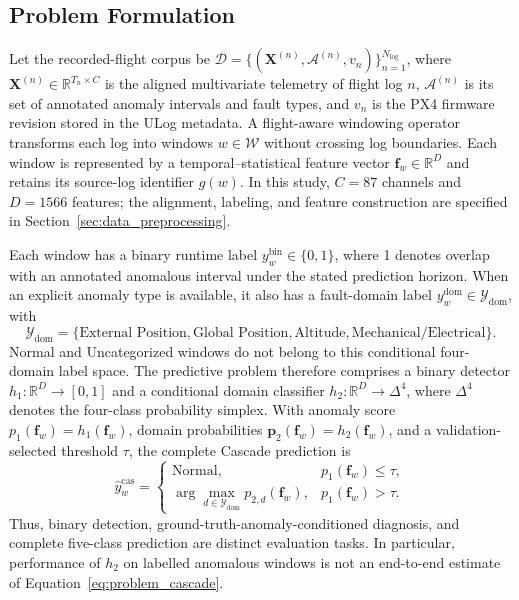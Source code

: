 \subsection{Problem Formulation}
\label{sec:problem_formulation}

Let the recorded-flight corpus be $\mathcal{D}=\{(\mathbf{X}^{(n)},\mathcal{A}^{(n)},v_n)\}_{n=1}^{N_{\mathrm{log}}}$, where $\mathbf{X}^{(n)}\in\mathbb{R}^{T_n\times C}$ is the aligned multivariate telemetry of flight log $n$, $\mathcal{A}^{(n)}$ is its set of annotated anomaly intervals and fault types, and $v_n$ is the PX4 firmware revision stored in the ULog metadata. A flight-aware windowing operator transforms each log into windows $w\in\mathcal{W}$ without crossing log boundaries. Each window is represented by a temporal--statistical feature vector $\mathbf{f}_w\in\mathbb{R}^{D}$ and retains its source-log identifier $g(w)$. In this study, $C=87$ channels and $D=1566$ features; the alignment, labeling, and feature construction are specified in Section~\ref{sec:data_preprocessing}.

Each window has a binary runtime label $y_w^{\mathrm{bin}}\in\{0,1\}$, where 1 denotes overlap with an annotated anomalous interval under the stated prediction horizon. When an explicit anomaly type is available, it also has a fault-domain label $y_w^{\mathrm{dom}}\in\mathcal{Y}_{\mathrm{dom}}$, with
\[
\mathcal{Y}_{\mathrm{dom}}=\{\text{External Position},\text{Global Position},\text{Altitude},\text{Mechanical/Electrical}\}.
\]
Normal and Uncategorized windows do not belong to this conditional four-domain label space. The predictive problem therefore comprises a binary detector $h_1:\mathbb{R}^{D}\rightarrow[0,1]$ and a conditional domain classifier $h_2:\mathbb{R}^{D}\rightarrow\Delta^{4}$, where $\Delta^{4}$ denotes the four-class probability simplex. With anomaly score $p_1(\mathbf{f}_w)=h_1(\mathbf{f}_w)$, domain probabilities $\mathbf{p}_2(\mathbf{f}_w)=h_2(\mathbf{f}_w)$, and a validation-selected threshold $\tau$, the complete Cascade prediction is
\begin{equation}
\hat{y}_w^{\mathrm{cas}}=
\begin{cases}
\text{Normal}, & p_1(\mathbf{f}_w)\leq\tau,\\
\displaystyle\arg\max_{d\in\mathcal{Y}_{\mathrm{dom}}}p_{2,d}(\mathbf{f}_w), & p_1(\mathbf{f}_w)>\tau.
\end{cases}
\label{eq:problem_cascade}
\end{equation}
Thus, binary detection, ground-truth-anomaly-conditioned diagnosis, and complete five-class prediction are distinct evaluation tasks. In particular, performance of $h_2$ on labelled anomalous windows is not an end-to-end estimate of Equation~\eqref{eq:problem_cascade}.

